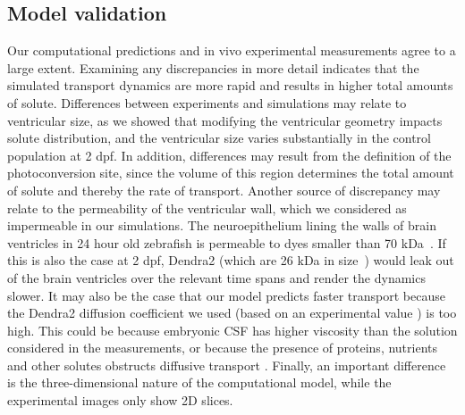 \documentclass{WileyMSP-template}
\begin{document}
\subsection{Model validation}

Our computational predictions and in vivo experimental measurements
agree to a large extent. Examining any discrepancies in more detail
indicates that the simulated transport dynamics are more rapid and
results in higher total amounts of solute. Differences between
experiments and simulations may relate to ventricular size, as we
showed that modifying the ventricular geometry impacts solute
distribution, and the ventricular size varies substantially in the
control population at 2 dpf. In addition, differences may result from
the definition of the photoconversion site, since the volume of this
region determines the total amount of solute and thereby the rate of
transport. Another source of discrepancy may relate to the
permeability of the ventricular wall, which we considered as
impermeable in our simulations. The neuroepithelium lining the walls
of brain ventricles in 24 hour old zebrafish is permeable to dyes
smaller than 70 kDa~\cite{Chang2012AnNeuroepithelium}.  If this is
also the case at 2 dpf, Dendra2 (which are 26 kDa in
size~\cite{Gurskaya2006EngineeringLight}) would leak out of the brain
ventricles over the relevant time spans and render the dynamics
slower.  It may also be the case that our model predicts faster
transport because the Dendra2 diffusion coefficient we used (based on
an experimental value \cite{GuraSadovsky2017MeasurementExpansion}) is
too high. This could be because embryonic CSF has higher viscosity
than the solution considered in the measurements, or because the
presence of proteins, nutrients and other solutes obstructs diffusive
transport \cite{Bloomfield1998EffectsFluid, Einstein1905UberTeilchen,
  Cussler2009Diffusion:Systems}. Finally, an important difference is
the three-dimensional nature of the computational model, while the
experimental images only show 2D slices.
\end{document}
